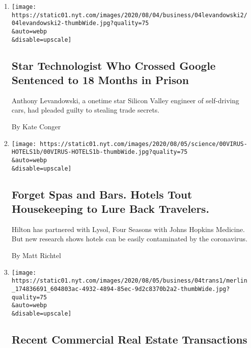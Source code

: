 \begin{enumerate}
\def\labelenumi{\arabic{enumi}.}
\item
  \href{/2020/08/04/technology/levandowski-google-uber-sentencing-trade-secrets.html}{}

  \texttt{[image: https://static01.nyt.com/images/2020/08/04/business/04levandowski2/04levandowski2-thumbWide.jpg?quality=75\\\&auto=webp\\\&disable=upscale]}

  \hypertarget{star-technologist-who-crossed-google-sentenced-to-18-months-in-prison}{%
  \subsection{Star Technologist Who Crossed Google Sentenced to 18
  Months in
  Prison}\label{star-technologist-who-crossed-google-sentenced-to-18-months-in-prison}}

  Anthony Levandowski, a onetime star Silicon Valley engineer of
  self-driving cars, had pleaded guilty to stealing trade secrets.

  By Kate Conger
\item
  \href{/2020/08/04/health/coronavirus-hotels-infect.html}{}

  \texttt{[image: https://static01.nyt.com/images/2020/08/05/science/00VIRUS-HOTELS1b/00VIRUS-HOTELS1b-thumbWide.jpg?quality=75\\\&auto=webp\\\&disable=upscale]}

  \hypertarget{forget-spas-and-bars-hotels-tout-housekeeping-to-lure-back-travelers}{%
  \subsection{Forget Spas and Bars. Hotels Tout Housekeeping to Lure
  Back
  Travelers.}\label{forget-spas-and-bars-hotels-tout-housekeeping-to-lure-back-travelers}}

  Hilton has partnered with Lysol, Four Seasons with Johns Hopkins
  Medicine. But new research shows hotels can be easily contaminated by
  the coronavirus.

  By Matt Richtel
\item
  \href{/2020/08/04/business/recent-commercial-real-estate-transactions.html}{}

  \texttt{[image: https://static01.nyt.com/images/2020/08/05/business/04trans1/merlin\_174836691\_604803ac-4932-4894-85ec-9d2c8370b2a2-thumbWide.jpg?quality=75\\\&auto=webp\\\&disable=upscale]}

  \hypertarget{recent-commercial-real-estate-transactions}{%
  \subsection{Recent Commercial Real Estate
  Transactions}\label{recent-commercial-real-estate-transactions}}


\end{enumerate}
